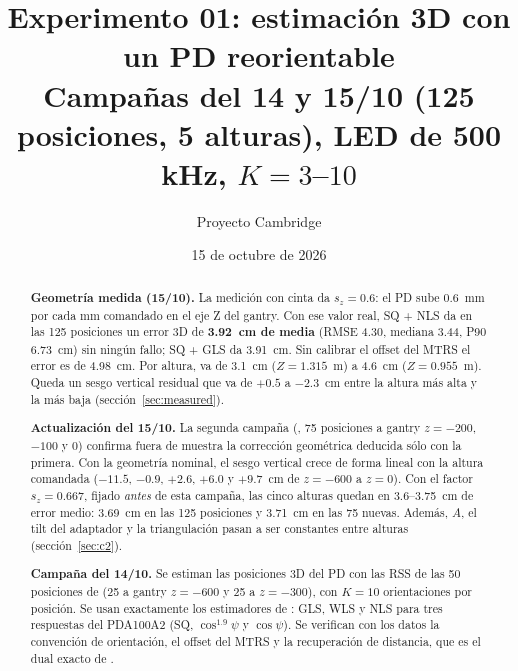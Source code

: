 \documentclass[11pt,a4paper]{article}
\title{Experimento 01: estimación 3D con un PD reorientable\\\large Campañas del 14 y 15/10 (125 posiciones, 5 alturas), LED de 500 kHz, $K=3$--$10$}
\author{Proyecto Cambridge}
\date{15 de octubre de 2026}
\begin{document}
\maketitle
\noindent{}
\medskip
\begin{abstract}
\textbf{Geometría medida (15/10).} La medición con cinta da $s_z=0.6$: el PD sube 0.6~mm por cada mm comandado en el eje Z del gantry. Con ese valor real, SQ + NLS da en las 125 posiciones un error 3D de \textbf{3.92~cm de media} (RMSE 4.30, mediana 3.44, P90 6.73~cm) sin ningún fallo; SQ + GLS da 3.91~cm. Sin calibrar el offset del MTRS el error es de 4.98~cm. Por altura, va de 3.1~cm ($Z=1.315$~m) a 4.6~cm ($Z=0.955$~m). Queda un sesgo vertical residual que va de $+0.5$ a $-2.3$~cm entre la altura más alta y la más baja (sección~\ref{sec:measured}).

\textbf{Actualización del 15/10.} La segunda campaña (, 75 posiciones a gantry $z=-200$, $-100$ y $0$) confirma fuera de muestra la corrección geométrica deducida sólo con la primera. Con la geometría nominal, el sesgo vertical crece de forma lineal con la altura comandada ($-11.5$, $-0.9$, $+2.6$, $+6.0$ y $+9.7$~cm de $z=-600$ a $z=0$). Con el factor $s_z=0.667$, fijado \emph{antes} de esta campaña, las cinco alturas quedan en 3.6--3.75~cm de error medio: 3.69~cm en las 125 posiciones y 3.71~cm en las 75 nuevas. Además, $A$, el tilt del adaptador y la triangulación pasan a ser constantes entre alturas (sección~\ref{sec:c2}).

\textbf{Campaña del 14/10.} Se estiman las posiciones 3D del PD con las RSS de las 50 posiciones de  (25 a gantry $z=-600$ y 25 a $z=-300$), con $K=10$ orientaciones por posición. Se usan exactamente los estimadores de : GLS, WLS y NLS para tres respuestas del PDA100A2 (SQ, $\cos^{1.9}\psi$ y $\cos\psi$). Se verifican con los datos la convención de orientación, el offset del MTRS y la recuperación de distancia, que es el dual exacto de .


\end{abstract}
\end{document}
